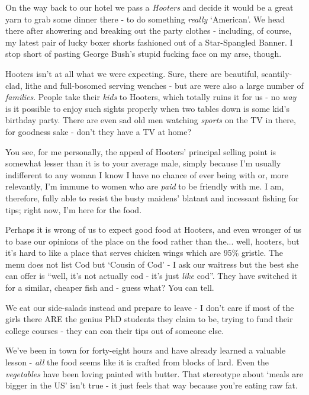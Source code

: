 \documentclass[a5paper,titlepage,11pt]{book}
\begin{document}
On the way back to our hotel we pass a \emph{Hooters} and decide it would be a great yarn to grab some dinner there - to do something \emph{really} `American'.  We head there after showering and breaking out the party clothes - including, of course, my latest pair of lucky boxer shorts fashioned out of a Star-Spangled Banner.  I stop short of pasting George Bush's stupid fucking face on my arse, though.

Hooters isn't at all what we were expecting.  Sure, there are beautiful, scantily-clad, lithe and full-bosomed serving wenches - but are were also a large number of \emph{families}.  People take their \emph{kids} to Hooters, which totally ruins it for us - no \emph{way} is it possible to enjoy such sights properly when two tables down is some kid's birthday party.  There are even sad old men watching \emph{sports} on the TV in there, for goodness sake - don't they have a TV at home?

You see, for me personally, the appeal of Hooters' principal selling point is somewhat lesser than it is to your average male, simply because I'm usually indifferent to any woman I know I have no chance of ever being with or, more relevantly, I'm immune to women who are \emph{paid} to be friendly with me.  I am, therefore, fully able to resist the busty maidens' blatant and incessant fishing for tips; right now, I'm here for the food.

Perhaps it is wrong of us to expect good food at Hooters, and even wronger of us to base our opinions of the place on the food rather than the... well, hooters, but it's hard to like a place that serves chicken wings which are 95\% gristle.  The menu does not list Cod but `Cousin of Cod' - I ask our waitress but the best she can offer is ``well, it's not actually cod - it's just \emph{like} cod''.  They have switched it for a similar, cheaper fish and - guess what?  You can tell.

We eat our side-salads instead and prepare to leave - I don't care if most of the girls there ARE the genius PhD students they claim to be, trying to fund their college courses - they can con their tips out of someone else.

We've been in town for forty-eight hours and have already learned a valuable lesson - \emph{all} the food seems like it is crafted from blocks of lard.  Even the \emph{vegetables} have been loving painted with butter.  That stereotype about `meals are bigger in the US' isn't true - it just feels that way because you're eating raw fat.
\end{document}
